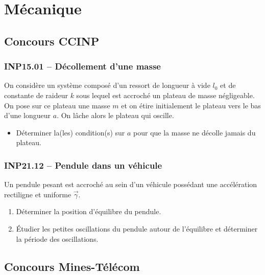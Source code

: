 \newpage
\section*{Mécanique}

\subsection*{Concours CCINP}

\subsubsection*{INP15.01 -- Décollement d'une masse }

On considère un système composé d'un ressort de longueur à vide $l_0$ et de constante de raideur $k$ sous lequel est accroché un plateau de masse négligeable. On pose sur ce plateau une masse $m$ et on étire initialement le plateau vers le bas d'une longueur $a$. On lâche alors le plateau qui oscille.

\begin{itemize}[label=\textbullet]
    \item Déterminer la(les) condition(s) sur $a$ pour que la masse ne décolle jamais du plateau.
\end{itemize}

\subsubsection*{INP21.12 -- Pendule dans un véhicule  \corrige}

Un pendule pesant est accroché au sein d'un véhicule possédant une accélération rectiligne et uniforme $\overrightarrow{\gamma}$.

\begin{enumerate}
    \item Déterminer la position d'équilibre du pendule.
    \item Étudier les petites oscillations du pendule autour de l'équilibre et déterminer la période des oscillations.
\end{enumerate}

\newpage
\subsection*{Concours Mines-Télécom}
